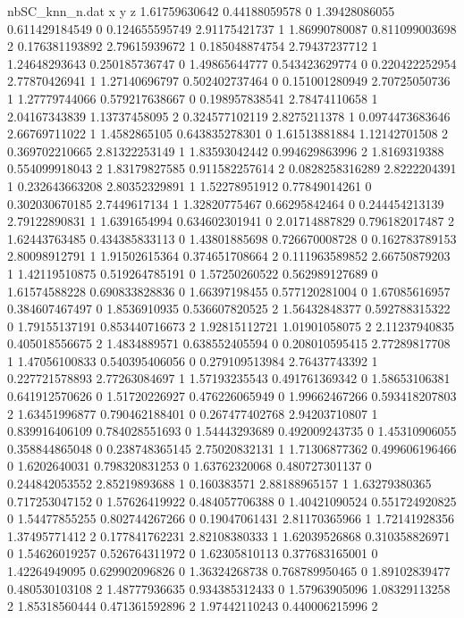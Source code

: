 \begin{filecontents}{nbSC_knn_n.dat}
x y z
1.61759630642 0.44188059578 0
1.39428086055 0.611429184549 0
0.124655595749 2.91175421737 1
1.86990780087 0.811099003698 2
0.176381193892 2.79615939672 1
0.185048874754 2.79437237712 1
1.24648293643 0.250185736747 0
1.49865644777 0.543423629774 0
0.220422252954 2.77870426941 1
1.27140696797 0.502402737464 0
0.151001280949 2.70725050736 1
1.27779744066 0.579217638667 0
0.198957838541 2.78474110658 1
2.04167343839 1.13737458095 2
0.324577102119 2.8275211378 1
0.0974473683646 2.66769711022 1
1.4582865105 0.643835278301 0
1.61513881884 1.12142701508 2
0.369702210665 2.81322253149 1
1.83593042442 0.994629863996 2
1.8169319388 0.554099918043 2
1.83179827585 0.911582257614 2
0.0828258316289 2.8222204391 1
0.232643663208 2.80352329891 1
1.52278951912 0.77849014261 0
0.302030670185 2.7449617134 1
1.32820775467 0.66295842464 0
0.244454213139 2.79122890831 1
1.6391654994 0.634602301941 0
2.01714887829 0.796182017487 2
1.62443763485 0.434385833113 0
1.43801885698 0.726670008728 0
0.162783789153 2.80098912791 1
1.91502615364 0.374651708664 2
0.111963589852 2.66750879203 1
1.42119510875 0.519264785191 0
1.57250260522 0.562989127689 0
1.61574588228 0.690833828836 0
1.66397198455 0.577120281004 0
1.67085616957 0.384607467497 0
1.8536910935 0.536607820525 2
1.56432848377 0.592788315322 0
1.79155137191 0.853440716673 2
1.92815112721 1.01901058075 2
2.11237940835 0.405018556675 2
1.4834889571 0.638552405594 0
0.208010595415 2.77289817708 1
1.47056100833 0.540395406056 0
0.279109513984 2.76437743392 1
0.227721578893 2.77263084697 1
1.57193235543 0.491761369342 0
1.58653106381 0.641912570626 0
1.51720226927 0.476226065949 0
1.99662467266 0.593418207803 2
1.63451996877 0.790462188401 0
0.267477402768 2.94203710807 1
0.839916406109 0.784028551693 0
1.54443293689 0.492009243735 0
1.45310906055 0.358844865048 0
0.238748365145 2.75020832131 1
1.71306877362 0.499606196466 0
1.6202640031 0.798320831253 0
1.63762320068 0.480727301137 0
0.244842053552 2.85219893688 1
0.160383571 2.88188965157 1
1.63279380365 0.717253047152 0
1.57626419922 0.484057706388 0
1.40421090524 0.551724920825 0
1.54477855255 0.802744267266 0
0.19047061431 2.81170365966 1
1.72141928356 1.37495771412 2
0.177841762231 2.82108380333 1
1.62039526868 0.310358826971 0
1.54626019257 0.526764311972 0
1.62305810113 0.377683165001 0
1.42264949095 0.629902096826 0
1.36324268738 0.768789950465 0
1.89102839477 0.480530103108 2
1.48777936635 0.934385312433 0
1.57963905096 1.08329113258 2
1.85318560444 0.471361592896 2
1.97442110243 0.440006215996 2

\end{filecontents}
